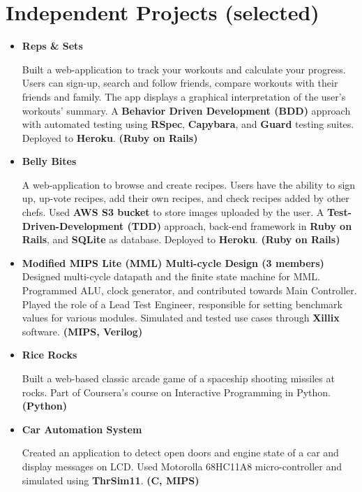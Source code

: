 \documentclass[10pt]{article}%
\begin{document}
\section*{Independent Projects (selected)}

\begin{itemize} \setlength{\parskip}{0.5pt}

\item \textbf{Reps \& Sets}  \href{https://repsandsets.herokuapp.com/}{\tt{\faLink}}

Built a web-application to track your workouts and calculate your progress. Users can sign-up, search and follow friends, compare workouts with their friends and family. The app displays a graphical interpretation of the user's workouts' summary. A \textbf{Behavior Driven Development (BDD)} approach with automated testing using \textbf{RSpec}, \textbf{Capybara}, and \textbf{Guard} testing suites. Deployed to \textbf{Heroku}. \textbf{(Ruby on Rails)}

\item \textbf{Belly Bites}  \href{https://bellybites.herokuapp.com/}{\tt{\faLink}}

A web-application to browse and create recipes. Users have the ability to sign up, up-vote recipes, add their own recipes, and check recipes added by other chefs. Used \textbf{AWS S3 bucket} to store images uploaded by the user. A \textbf{Test-Driven-Development (TDD)} approach, back-end framework in \textbf{Ruby on Rails}, and \textbf{SQLite} as database. Deployed to \textbf{Heroku}. \textbf{(Ruby on Rails)}

\item \textbf{Modified MIPS Lite (MML) Multi-cycle Design (3 members)}  \\
Designed multi-cycle datapath and the finite state machine for MML. Programmed ALU, clock generator, and contributed towards Main Controller. Played the role of a Lead Test Engineer, responsible for setting benchmark values for various modules. Simulated and tested use cases through \textbf{Xillix} software. \textbf{(MIPS, Verilog)}

 
\item \textbf{Rice Rocks}  \href{http://www.codeskulptor.org/#user38_DZUIDXywMeaZ0Wx_5.py}{\tt{\faLink}}

Built a web-based classic arcade game of a spaceship shooting missiles at rocks. Part of Coursera's course on Interactive Programming in Python. \textbf{(Python)}


\item \textbf{Car Automation System} 

Created an application to detect open doors and engine state of a car and display messages on LCD. Used Motorolla 68HC11A8 micro-controller and simulated using \textbf{ThrSim11}. \textbf{(C, MIPS)}
\end{itemize}
\end{document}
